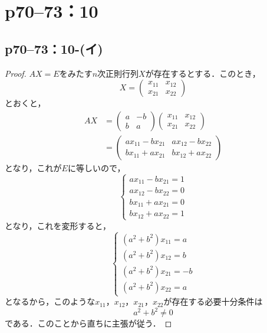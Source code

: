 \documentclass[a4paper,10pt,fleqn]{ltjsarticle}
\begin{document}
\newpage


\section*{p70--73：10}

\subsection*{p70--73：10-(イ)}

\begin{tleftbar}
    \begin{proof}
        $AX=E$をみたす$n$次正則行列$X$が存在するとする．このとき，
        \[
            X = \begin{pmatrix} x_{11} & x_{12} \\ x_{21} & x_{22} \end{pmatrix}
        \]
        とおくと，
        \begin{align*}
            AX & = \begin{pmatrix} a & -b \\ b & a \end{pmatrix} \begin{pmatrix} x_{11} & x_{12} \\ x_{21} & x_{22} \end{pmatrix} \\
               & = \begin{pmatrix} ax_{11}-bx_{21} & ax_{12}-bx_{22} \\ bx_{11}+ax_{21} & bx_{12}+ax_{22} \end{pmatrix}
        \end{align*}
        となり，これが$E$に等しいので，
        \[
            \begin{cases}
                ax_{11}-bx_{21} =1 \\
                ax_{12}-bx_{22} =0 \\
                bx_{11}+ax_{21} =0 \\
                bx_{12}+ax_{22} =1
            \end{cases}
        \]
        となり，これを変形すると，
        \[
            \begin{cases}
                (a^2+b^2) x_{11} = a \\
                (a^2+b^2) x_{12} = b \\
                (a^2+b^2) x_{21}=-b  \\
                (a^2+b^2) x_{22} = a
            \end{cases}
        \]
        となるから，このような$x_{11}$，$x_{12}$，$x_{21}$，$x_{22}$が存在する必要十分条件は
        \[
            a^2 + b^2 \ne 0
        \]
        である．このことから直ちに主張が従う．
    \end{proof}
\end{tleftbar}
\end{document}
